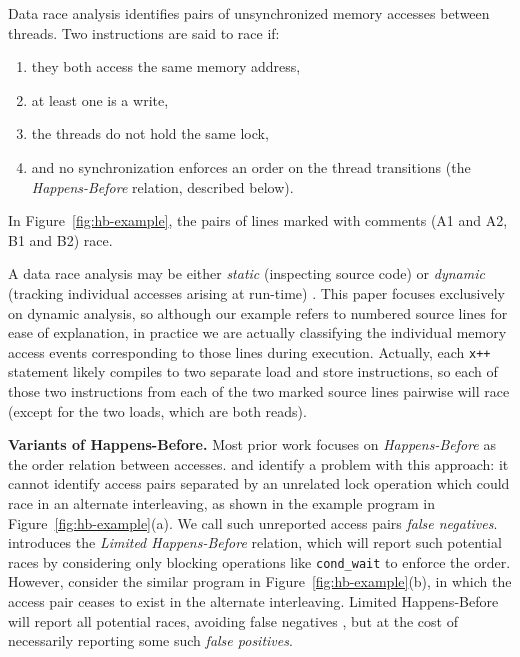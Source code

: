 Data race analysis \cite{eraser} identifies pairs of unsynchronized memory accesses between threads.
Two instructions are said to race if:
\begin{enumerate}
	\item they both access the same memory address,
	\item at least one is a write,
	\item the threads do not hold the same lock,
	\item and no synchronization enforces an order on the thread transitions (the {\em Happens-Before} relation, described below).
\end{enumerate}
In Figure~\ref{fig:hb-example}, the pairs of lines marked with comments (A1 and A2, B1 and B2) race.

A data race analysis may be either {\em static} (inspecting source code) \cite{racerx} or {\em dynamic} (tracking individual accesses arising at run-time) \cite{tsan}.
This paper focuses exclusively on dynamic analysis,
so although our example refers to numbered source lines for ease of explanation,
in practice we are actually classifying the individual memory access events corresponding to those lines during execution.
Actually, each {\tt x++} statement likely compiles to two separate load and store instructions, so each of those two instructions from each of the two marked source lines pairwise will race (except for the two loads, which are both reads).

{\bf Variants of Happens-Before.}
        Most prior work focuses on {\em Happens-Before} \cite{lamport-clocks} as the order relation between accesses.
\cite{predictive-dr} and \cite{hybriddatarace} identify a problem with this approach:
it cannot identify access pairs separated by an unrelated lock operation which could race in an alternate interleaving,
as shown in the example program in Figure~\ref{fig:hb-example}(a).
We call such unreported access pairs {\em false negatives}.
\cite{hybriddatarace} introduces the {\em Limited Happens-Before} relation,
which will report such potential races
by considering only blocking operations like {\tt cond\_wait} to enforce the order.
However, consider the similar program in Figure~\ref{fig:hb-example}(b),
in which the access pair ceases to exist in the alternate interleaving.
Limited Happens-Before will report all potential races, avoiding false negatives \cite{tsan},
but at the cost of necessarily reporting some such {\em false positives}.

